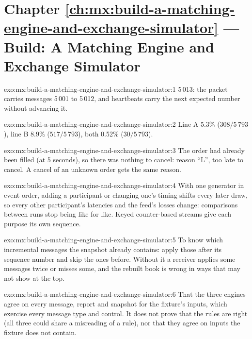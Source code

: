 \section*{Chapter \ref{ch:mx:build-a-matching-engine-and-exchange-simulator} --- Build: A Matching Engine and Exchange Simulator}

\begin{solution}{exo:mx:build-a-matching-engine-and-exchange-simulator:1}
5\,013: the packet carries messages 5\,001 to 5\,012, and heartbeats carry the next expected number without advancing it.
\end{solution}

\begin{solution}{exo:mx:build-a-matching-engine-and-exchange-simulator:2}
Line A 5.3\% ($308/5\,793$), line B 8.9\% ($517/5\,793$), both 0.52\% ($30/5\,793$).
\end{solution}

\begin{solution}{exo:mx:build-a-matching-engine-and-exchange-simulator:3}
The order had already been filled (at 5 seconds), so there was nothing to cancel: reason ``L'', too late to cancel. A cancel of an unknown order gets the
same reason.
\end{solution}

\begin{solution}{exo:mx:build-a-matching-engine-and-exchange-simulator:4}
With one generator in event order, adding a participant or changing one's timing shifts every later draw, so every other participant's latencies and the
feed's losses change: comparisons between runs stop being like for like. Keyed counter-based streams give each purpose its own sequence.
\end{solution}

\begin{solution}{exo:mx:build-a-matching-engine-and-exchange-simulator:5}
To know which incremental messages the snapshot already contains: apply those after its sequence number and skip the ones before. Without it a receiver
applies some messages twice or misses some, and the rebuilt book is wrong in ways that may not show at the top.
\end{solution}

\begin{solution}{exo:mx:build-a-matching-engine-and-exchange-simulator:6}
That the three engines agree on every message, report and snapshot for the fixture's inputs, which exercise every message type and control. It does not
prove that the rules are right (all three could share a misreading of a rule), nor that they agree on inputs the fixture does not contain.
\end{solution}


